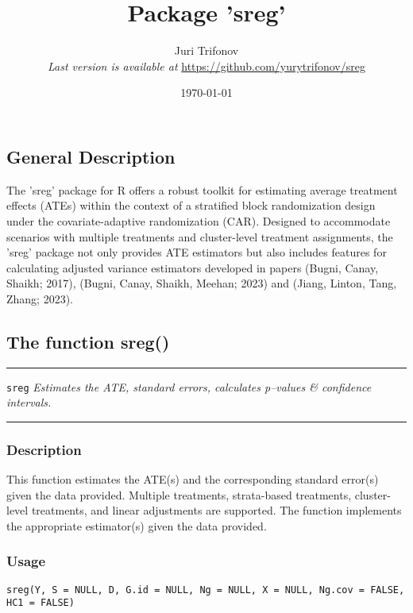 \documentclass{article}
\title{\textbf{Package 'sreg'}}
\author{Juri Trifonov \\ \textit{Last version is available at} \href{https://github.com/yurytrifonov/sreg}{https://github.com/yurytrifonov/sreg}
}
\date{\today}
\newenvironment{cranfunction}[2]{%
    \textcolor{linecolor}{\rule{\linewidth}{0.4pt}}\par\vspace*{\fill}
    \texttt{#1} \hfill #2\par\nobreak\noindent
    \textcolor{linecolor}{\rule{\linewidth}{0.4pt}}\vspace*{\fill}\par
}{%

}
\begin{document}
\maketitle

\subsection*{General Description}
The 'sreg' package for R offers a robust toolkit for estimating average treatment effects (ATEs) within the context of a stratified block randomization design under the covariate-adaptive randomization (CAR). Designed to accommodate scenarios with multiple treatments and cluster-level treatment assignments, the 'sreg' package not only provides ATE estimators but also includes features for calculating adjusted variance estimators developed in papers (Bugni, Canay, Shaikh; 2017), (Bugni, Canay, Shaikh, Meehan; 2023) and (Jiang, Linton, Tang, Zhang; 2023).

\subsection*{The function sreg()}

\begin{cranfunction}{sreg}{\textit{Estimates the ATE, standard errors, calculates p--values \& confidence intervals.}}
\end{cranfunction}
\subsubsection*{Description}
This function estimates the ATE(s) and the corresponding standard error(s) given the data provided. Multiple treatments, strata-based treatments, cluster-level treatments, and linear adjustments are supported. The function implements the appropriate estimator(s) given the data provided.
\subsubsection*{Usage}
\texttt{sreg(Y, S = NULL, D, G.id = NULL, Ng = NULL, X = NULL, Ng.cov = FALSE, HC1 = FALSE)}
\end{document}
